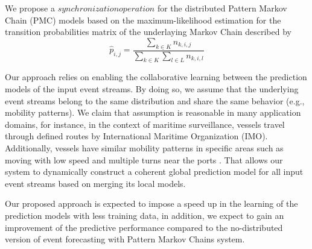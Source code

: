  \par We propose a $synchronization operation$  for the distributed Pattern Markov Chain (PMC) models based on the maximum-likelihood estimation \citep{anderson1957statistical} for the transition probabilities matrix of the underlaying Markov Chain described by 
 \begin{equation}
 \label{eq:pi_estim}
 \hat{p}_{i,j}=\frac{\sum_{k \in K} n_{k,i,j}}{\sum_{k \in K} \sum_{l \in L} n_{k,i,l}}
 \end{equation}
  
  
 \par Our approach relies on enabling the collaborative learning between the prediction models of  the input event streams. By doing so, we assume that the underlying event streams belong to the same  distribution and share the same behavior (e.g., mobility patterns). We claim that assumption is reasonable in many application domains, for instance, in the context of maritime surveillance, vessels travel through defined routes by International Maritime Organization (IMO). Additionally, vessels have similar mobility patterns in specific areas such as moving with low speed and multiple turns near the ports \cite{pallotta2013vessel,liu2014knowledge}. That allows our system to dynamically construct a coherent global prediction model for all input event streams based on merging its local models. %
 
  \par Our proposed approach is expected to impose a speed up in the learning of the prediction models with less training data, in addition, we expect to gain an improvement of the predictive performance compared to the no-distributed  version of event forecasting with Pattern Markov Chains system. 
 




%

